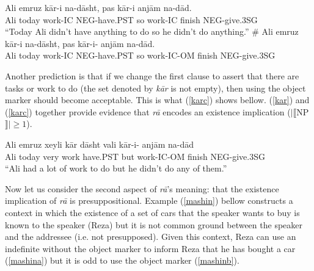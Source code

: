 \documentclass[12pt]{article}
\begin{document}
	\begin {exe}
		\ex \label{kar}\begin {xlist}
		\ex \label{kara}
		\gll	Ali emruz k\={a}r-i	 na-d\={a}sht, pas	k\={a}r-i	anj\={a}m na-d\={a}d.\\
			Ali today work-{\scriptsize IC} {\scriptsize NEG}-have{\scriptsize .PST} so	work-{\scriptsize IC}	finish {\scriptsize NEG}-give.{\scriptsize 3SG}\\
		\glt 	``Today Ali didn't have anything to do so he didn't do anything.''
		\ex \label{karb}
		\gll	\# Ali emruz k\={a}r-i	 na-d\={a}sht, pas	k\={a}r-i-	anj\={a}m na-d\={a}d.\\
			{}	Ali today work-{\scriptsize IC} {\scriptsize NEG}-have{\scriptsize .PST} so	work-{\scriptsize IC-OM}	finish {\scriptsize NEG}-give.{\scriptsize 3SG}\\
		\end {xlist}
	\end {exe}

Another prediction is that if we change the first clause to assert that there are tasks or work to do (the set denoted by \emph{k\={a}r} is not empty), then using the object marker should become acceptable. This is what (\ref{karc}) shows bellow. (\ref{kar}) and (\ref{karc}) together provide evidence that \emph{r\={a}} encodes an existence implication ($|\llbracket$NP$\rrbracket| \geq 1$).

\begin {exe}
	\ex \label{karc}
	\gll	Ali emruz xeyli k\={a}r	 d\={a}sht vali	k\={a}r-i-	anj\={a}m na-d\={a}d\\
		Ali today very work have{\scriptsize .PST} but	work-{\scriptsize IC-OM}	finish {\scriptsize NEG}-give.{\scriptsize 3SG}\\
	\glt 	``Ali had a lot of work to do but he didn't do any of them.''
\end {exe}

Now let us consider the second aspect of \emph{r\={a}}'s meaning: that the existence implication of \emph{r\={a}} is presuppositional. Example (\ref{mashin}) bellow constructs a context in which the existence of a set of cars that the speaker wants to buy is known to the speaker (Reza) but it is not common ground between the speaker and the addressee (i.e. not presupposed). Given this context, Reza can use an indefinite without the object marker to inform Reza that he has bought a car (\ref{mashina}) but it is odd to use the object marker (\ref{mashinb}). 
\end{document}
